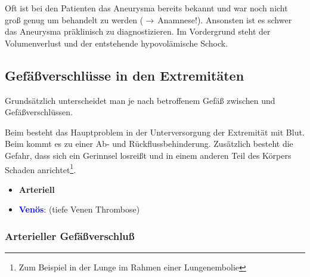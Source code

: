 


Oft ist bei den Patienten das Aneurysma bereits bekannt und
war noch nicht groß genug um behandelt zu werden
(${\rightarrow}$\,Anamnese!). Ansonsten ist es schwer das
Aneurysma präklinisch zu diagnostizieren. Im Vordergrund
steht der Volumenverlust und der entstehende hypovolämische
Schock. 


\clearpage
\subsection{Gefäßverschlüsse in den Extremitäten}

{
Grundsätzlich unterscheidet man je nach betroffenem Gefäß
zwischen  und 
Gefäßverschlüssen. 

Beim  besteht
das Hauptproblem in der Unterversorgung der Extremität mit
Blut. Beim  kommt es zu einer Ab- und
Rückflussbehinderung. Zusätzlich besteht die Gefahr, dass sich
ein Gerinnsel losreißt und in einem anderen Teil des
Körpers Schaden anrichtet\footnote{Zum Beispiel in der
Lunge im Rahmen einer Lungenembolie}.
}{
\begin{itemize}
  \item \textbf{\textcolor[rgb]{0.7882353,0.0,0.08627451}{Arteriell}}
  \item \textbf{\textcolor{blue}{Venös}}:
   (tiefe Venen Thrombose)
\end{itemize}
}{}{}{}



\subsubsection{Arterieller Gefäßverschluß}

